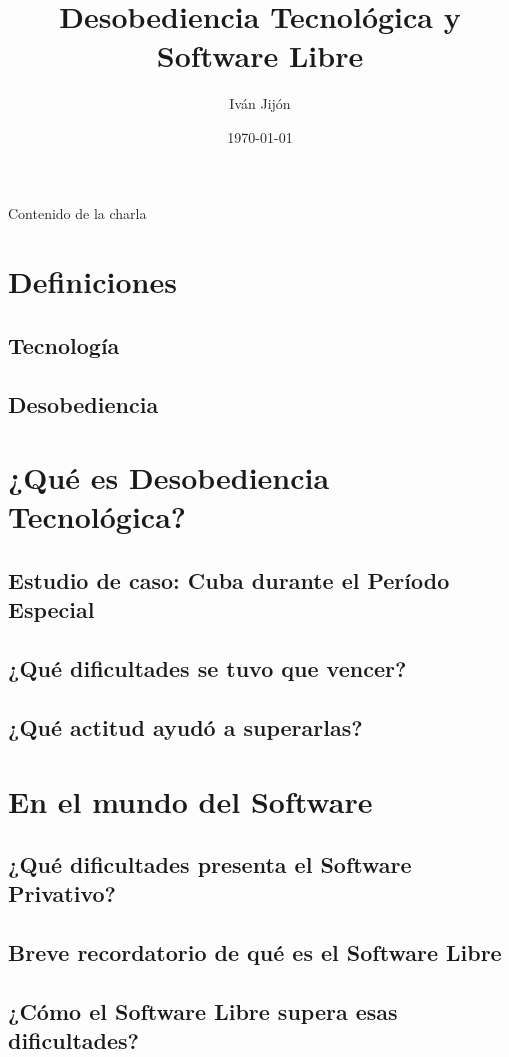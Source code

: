 \documentclass[spanish]{beamer}
\title{Desobediencia Tecnológica y Software Libre}
\author{Iván Jijón}
\institute{ FLISoL 2023, Quito - Ecuador}
\date{\today}
\begin{document}
\begin{frame}
    \titlepage
\end{frame}


\begin{frame}{Contenido de la charla}
    \tableofcontents
\end{frame}

\section{Definiciones}
    \subsection{Tecnología}
    \subsection{Desobediencia}
\section{¿Qué es \textbf{Desobediencia Tecnológica}?}
    \subsection{Estudio de caso: Cuba durante el Período Especial}
    \subsection{¿Qué \textbf{dificultades} se tuvo que vencer?}
    \subsection{¿Qué actitud ayudó a \textbf{superarlas}?}
\section{En el mundo del Software}
    \subsection{¿Qué dificultades presenta el \textbf{Software Privativo}?}
    \subsection{Breve recordatorio de qué es el \textbf{Software Libre}}
    \subsection{¿Cómo el \textbf{Software Libre} supera esas dificultades?}
\end{document}
